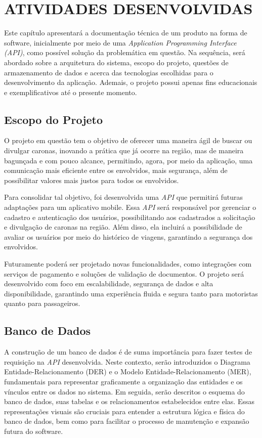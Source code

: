 \chapter{ATIVIDADES DESENVOLVIDAS}

Este capítulo apresentará a documentação técnica de um produto na forma de software, inicialmente por meio de uma \textit{Application Programming Interface (API)}, como possível solução da problemática em questão. Na sequência, será abordado sobre a arquitetura do sistema, escopo do projeto, questões de armazenamento de dados e acerca das tecnologias escolhidas para o desenvolvimento da aplicação. Ademais, o projeto possui apenas fins educacionais e exemplificativos até o presente momento.

\section{Escopo do Projeto}

O projeto em questão tem o objetivo de oferecer uma maneira ágil de buscar ou divulgar caronas, inovando a prática que já ocorre na região, mas de maneira bagunçada e com pouco alcance, permitindo, agora, por meio da aplicação, uma comunicação mais eficiente entre os envolvidos, mais segurança, além de possibilitar valores mais justos para todos os envolvidos. 

Para consolidar tal objetivo, foi desenvolvida uma \textit{API} que permitirá futuras adaptações para um aplicativo mobile. Essa \textit{API} será responsável por gerenciar o cadastro e autenticação dos usuários, possibilitando aos cadastrados a solicitação e divulgação de caronas na região. Além disso, ela incluirá a possibilidade de avaliar os usuários por meio do histórico de viagens, garantindo a segurança dos envolvidos.

Futuramente poderá ser projetado novas funcionalidades, como integrações com serviços de pagamento e soluções de validação de documentos. O projeto será desenvolvido com foco em escalabilidade, segurança de dados e alta disponibilidade, garantindo uma experiência fluida e segura tanto para motoristas quanto para passageiros.


\section{Banco de Dados}

A construção de um banco de dados é de suma importância para fazer testes de requisição na \textit{API} desenvolvida. Neste contexto, serão introduzidos o Diagrama Entidade-Relacionamento (DER) e o Modelo Entidade-Relacionamento (MER), fundamentais para representar graficamente a organização das entidades e os vínculos entre os dados no sistema. Em seguida, serão descritos o esquema do banco de dados, suas tabelas e os relacionamentos estabelecidos entre elas. Essas representações visuais são cruciais para entender a estrutura lógica e física do banco de dados, bem como para facilitar o processo de manutenção e expansão futura do software.

